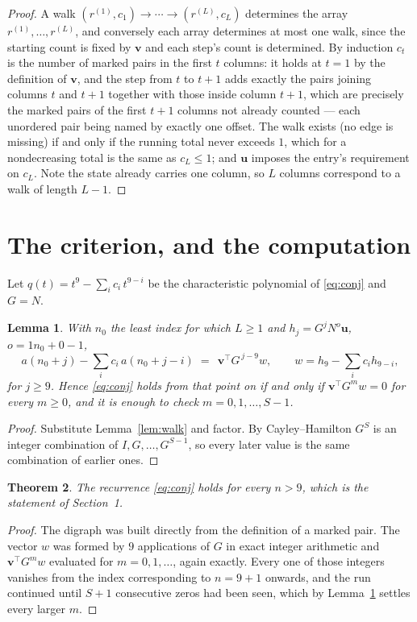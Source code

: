 \documentclass[11pt,a4paper]{article}
\theoremstyle{plain}
\newtheorem{theorem}{Theorem}
\newtheorem{lemma}[theorem]{Lemma}
\theoremstyle{definition}
\begin{document}
\begin{proof}
A walk $(r^{(1)},c_1)\to\cdots\to(r^{(L)},c_L)$ determines the array
$r^{(1)},\dots,r^{(L)}$, and conversely each array determines at most one walk, since the
starting count is fixed by $\mathbf{v}$ and each step's count is determined. By induction
$c_t$ is the number of marked pairs in the first $t$ columns: it holds at $t=1$ by the
definition of $\mathbf{v}$, and the step from $t$ to $t+1$ adds exactly the pairs joining
columns $t$ and $t+1$ together with those inside column $t+1$, which are precisely the marked
pairs of the first $t+1$ columns not already counted --- each unordered pair being named by
exactly one offset. The walk exists (no edge is missing) if and only if the running total
never exceeds $1$, which for a nondecreasing total is the same as $c_L\le1$; and
$\mathbf{u}$ imposes the entry's requirement on $c_L$. Note the state already carries one
column, so $L$ columns correspond to a walk of length $L-1$.
\end{proof}

\section{The criterion, and the computation}

Let $q(t)=t^{9}-\sum_i c_i\,t^{9-i}$ be the characteristic polynomial of
\eqref{eq:conj} and $G=N$.

\begin{lemma}\label{lem:crit}
With $n_0$ the least index for which $L\ge1$ and $h_j=G^{j}N^{o}\mathbf{u}$,
$o=1n_0+0-1$,
\[
a(n_0+j)-\sum_i c_i\,a(n_0+j-i)\;=\;\,\mathbf{v}^{\!\top}G^{\,j-9}w,
\qquad w=h_{9}-\sum_i c_i h_{9-i},
\]
for $j\ge9$. Hence \eqref{eq:conj} holds from that point on if and only if
$\mathbf{v}^{\!\top}G^{m}w=0$ for every $m\ge0$, and it is enough to check
$m=0,1,\dots,S-1$.
\end{lemma}

\begin{proof}
Substitute Lemma~\ref{lem:walk} and factor. By Cayley--Hamilton $G^{S}$ is an integer
combination of $I,G,\dots,G^{S-1}$, so every later value is the same combination of earlier
ones.
\end{proof}

\begin{theorem}
The recurrence \eqref{eq:conj} holds for every $n>9$, which is the statement of
Section~1.
\end{theorem}

\begin{proof}
The digraph was built directly from the definition of a marked pair. The vector $w$ was
formed by $9$ applications of $G$ in exact integer arithmetic and
$\mathbf{v}^{\!\top}G^{m}w$ evaluated for $m=0,1,\dots$, again exactly. Every one of
those integers vanishes from the index corresponding to $n=9+1$ onwards, and the run
continued until $S+1$ consecutive zeros had been seen, which by Lemma~\ref{lem:crit}
settles every larger $m$.
\end{proof}
\end{document}

